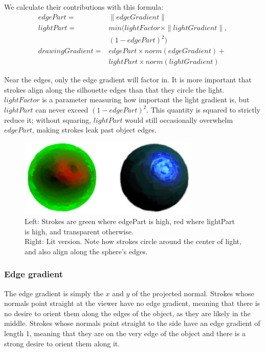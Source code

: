 \documentclass[conference]{acmsiggraph}
\begin{document}
We calculate their contributions with this formula:
\begin{align*}
  edgePart = &\| edgeGradient \| \\
  lightPart = &min(lightFactor \times \| lightGradient \| , \\
              &(1 - edgePart)^2) \\
  drawingGradient = &edgePart \times norm(edgeGradient) +\\
                &lightPart \times norm(lightGradient)
\end{align*}

Near the edges, only the edge gradient will factor in. It is more important
that strokes align along the silhouette edges than that they circle the light.
$lightFactor$ is a parameter measuring how important the light gradient is,
but $lightPart$ can never exceed $(1 - edgePart)^2$. This quantity is squared
to strictly reduce it; without squaring, $lightPart$ would still occasionally
overwhelm $edgePart$, making strokes leak past object edges.


\begin{figure}
  \centering
  \includegraphics[width=3.4in]{images/spheres_together}
  \caption{Left: Strokes are green where edgePart is high, red where lightPart is
           high, and transparent otherwise. \\ Right: Lit version. Note how
           strokes circle around the center of light, and also align along the
           sphere's edges.}
\end{figure}

\subsubsection{Edge gradient}

The edge gradient is simply the $x$ and $y$ of the projected normal. Strokes whose
normals point straight at the viewer have no edge gradient, meaning that there
is no desire to orient them along the edges of the object, as they are likely
in the middle. Strokes whose normals point straight to the side have an
edge gradient of length 1, meaning that they are on the very edge of the
object and there is a strong desire to orient them along it.
\end{document}

